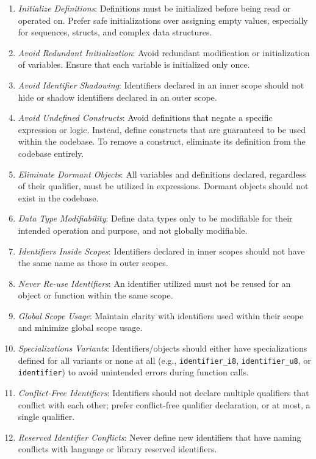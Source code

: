 \documentclass[9pt]{IEEEtran} %
\begin{document}
\begin{enumerate}
  \item \textit{Initialize Definitions}: Definitions must be initialized before being read or operated on. Prefer safe initializations over assigning empty values, especially for sequences, structs, and complex data structures.
  \item \textit{Avoid Redundant Initialization}: Avoid redundant modification or initialization of variables. Ensure that each variable is initialized only once.
  \item \textit{Avoid Identifier Shadowing}: Identifiers declared in an inner scope should not hide or shadow identifiers declared in an outer scope.
  \item \textit{Avoid Undefined Constructs}: Avoid definitions that negate a specific expression or logic. Instead, define constructs that are guaranteed to be used within the codebase. To remove a construct, eliminate its definition from the codebase entirely.
  \item \textit{Eliminate Dormant Objects}: All variables and definitions declared, regardless of their qualifier, must be utilized in expressions. Dormant objects should not exist in the codebase.
  \item \textit{Data Type Modifiability}: Define data types only to be modifiable for their intended operation and purpose, and not globally modifiable.
  \item \textit{Identifiers Inside Scopes}: Identifiers declared in inner scopes should not have the same name as those in outer scopes.
  \item \textit{Never Re-use Identifiers}: An identifier utilized must not be reused for an object or function within the same scope.
  \item \textit{Global Scope Usage}: Maintain clarity with identifiers used within their scope and minimize global scope usage.
  \item \textit{Specializations Variants}: Identifiers/objects should either have specializations defined for all variants or none at all (e.g., \texttt{identifier\_i8}, \texttt{identifier\_u8}, or \texttt{identifier}) to avoid unintended errors during function calls.
  \item \textit{Conflict-Free Identifiers}: Identifiers should not declare multiple qualifiers that conflict with each other; prefer conflict-free qualifier declaration, or at most, a single qualifier. 
  \item \textit{Reserved Identifier Conflicts}: Never define new identifiers that have naming conflicts with language or library reserved identifiers.

\end{enumerate}
\end{document}
